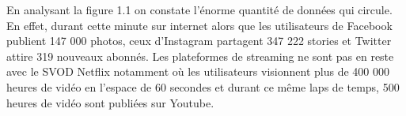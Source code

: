 En analysant la figure 1.1 on constate l'énorme quantité de données qui circule.  En effet, durant cette minute sur internet alors que les utilisateurs de Facebook publient 147 000 photos, ceux d'Instagram partagent 347 222 stories et Twitter attire 319 nouveaux abonnés. Les plateformes de streaming ne sont pas en reste avec le SVOD Netflix notamment où les utilisateurs visionnent plus de 400 000 heures de vidéo en l'espace de 60 secondes et durant ce même laps de temps, 500 heures de vidéo sont publiées sur Youtube.